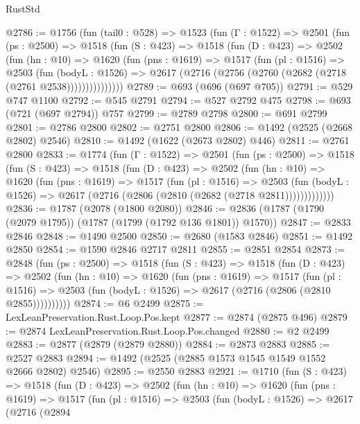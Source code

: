 \begin{lexlean}{RustStd}
\begin{coremodule}
{\begin{coremodule}
{{{{{{{{{{{{{@2786 := @1756
    (fun (tail0 : @528) =>
    @1523
      (fun (Γ : @1522) =>
      @2501
        (fun (ps : @2500) =>
        @1518
          (fun (S : @423) =>
          @1518
            (fun (D : @423) =>
            @2502
              (fun (hn : @10) =>
              @1620
                (fun (pns : @1619) =>
                @1517
                  (fun (pl : @1516) =>
                  @2503
                    (fun (bodyL : @1526) =>
                    @2617 (@2716 (@2756 (@2760 (@2682 (@2718 (@2761 @2538)))))))))))))))
@2789 := @693 (@696 (@697 @705))
@2791 := @529 @747 @1100
@2792 := @545 @2791
@2794 := @527 @2792 @475
@2798 := @693 (@721 (@697 @2794)) @757
@2799 := @2789 @2798
@2800 := @691 @2799
@2801 := @2786 @2800
@2802 := @2751 @2800
@2806 := @1492 (@2525 (@2668 @2802) @2546)
@2810 := @1492 (@1622 (@2673 @2802) @446)
@2811 := @2761 @2800
@2833 := @1774
    (fun (Γ : @1522) =>
    @2501
      (fun (ps : @2500) =>
      @1518
        (fun (S : @423) =>
        @1518
          (fun (D : @423) =>
          @2502
            (fun (hn : @10) =>
            @1620
              (fun (pns : @1619) =>
              @1517
                (fun (pl : @1516) =>
                @2503
                  (fun (bodyL : @1526) =>
                  @2617 (@2716 (@2806 (@2810 (@2682 (@2718 @2811)))))))))))))
@2836 := @1787 (@2078 (@1800 @2080))
@2846 := @2836 (@1787 (@1790 (@2079 @1795)) (@1787 (@1799 (@1792 @136 @1801)) @1570))
@2847 := @2833 @2846
@2848 := @1490 @2500
@2850 := @2680 (@1583 @2846)
@2851 := @1492 @2850
@2854 := @1590 @2846 @2717 @2811
@2855 := @2851 @2854
@2873 := @2848
    (fun (ps : @2500) =>
    @1518
      (fun (S : @423) =>
      @1518
        (fun (D : @423) =>
        @2502
          (fun (hn : @10) =>
          @1620
            (fun (pns : @1619) =>
            @1517
              (fun (pl : @1516) =>
              @2503 (fun (bodyL : @1526) => @2617 (@2716 (@2806 (@2810 @2855))))))))))
@2874 := @6 @2499
@2875 := LexLeanPreservation.Rust.Loop.Pos.kept
@2877 := @2874 (@2875 @496)
@2879 := @2874 LexLeanPreservation.Rust.Loop.Pos.changed
@2880 := @2 @2499
@2883 := @2877 (@2879 (@2879 @2880))
@2884 := @2873 @2883
@2885 := @2527 @2883
@2894 := @1492 (@2525 (@2885 @1573 @1545 @1549 @1552 @2666 @2802) @2546)
@2895 := @2550 @2883
@2921 := @1710
    (fun (S : @423) =>
    @1518
      (fun (D : @423) =>
      @2502
        (fun (hn : @10) =>
        @1620
          (fun (pns : @1619) =>
          @1517
            (fun (pl : @1516) =>
            @2503
              (fun (bodyL : @1526) =>
              @2617
                (@2716
                  (@2894
}}}}}}}}}}}}}
\end{coremodule}}
\end{coremodule}
\end{lexlean}
